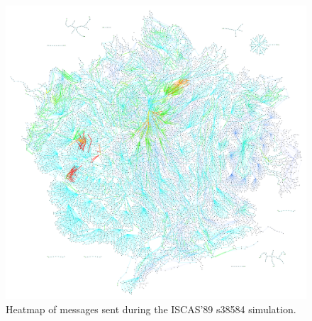 \documentclass[11pt]{book}
\begin{document}
\begin{figure}
\centering
\includegraphics[width=\textwidth,height=0.9\textheight,keepaspectratio]{figs/s38584}
\caption{Heatmap of messages sent during the ISCAS'89 s38584 simulation.}
\end{figure}
\end{document}

